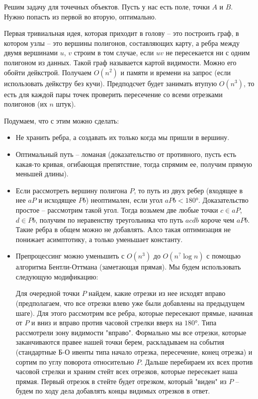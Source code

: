 \documentclass[11pt]{article}
\begin{document}
Решим задачу для точечных объектов. Пусть у нас есть поле, точки \(A\)
и \(B\). Нужно попасть из первой во вторую, оптимально.

Первая тривиальная идея, которая приходит в голову -- это построить
граф, в котором узлы -- это вершины полигонов, составляющих карту, а
ребра между двумя вершинами \(u\), \(v\) строим в том случае, если \(uv\)
не пересекается ни с одним полигоном из данных. Такой граф
называется картой видимости. Можно его обойти дейкстрой. Получаем
\(O(n^2)\) и памяти и времени на запрос (если использовать дейкстру
без кучи). Предподсчет будет занимать втупую \(O(n^3)\), то есть для
каждой пары точек проверить пересечение со всеми отрезками полигонов
(их \(n\) штук).

Подумаем, что с этим можно сделать:
\begin{itemize}
\item Не хранить ребра, а создавать их только когда мы пришли в вершину.
\item Оптимальный путь -- ломаная (доказательство от противного, пусть
есть какая-то кривая, огибающая препятствие, тогда спрямим ее,
получим прямую меньшей длины).
\item Если рассмотреть вершину полигона \(P\), то путь из двух ребер
(входящее в нее \(aP\) и исходящее \(Pb\)) неоптимален, если угол \(aPb
    < 180°\). Доказательство простое -- рассмотрим такой угол. Тогда
возьмем две любые точки \(c ∈ aP\), \(d ∈ Pb\), получим по неравенству
треугольника что путь \(acdb\) короче чем \(aPb\). Такие ребра в общем
можно не добавлять. Алсо такая оптимизация не понижает
асимптотику, а только уменьшает константу.
\item Препроцессинг можно уменьшить с \(O(n^3)\) до \(O(n^{?}\log{n})\) с
помощью алгоритма Бентли-Оттмана (заметающая прямая). Мы будем
использовать следующую модификацию:

Для очередной точки \(P\) найдем, какие отрезки из нее исходят
вправо (предполагаем, что все отрезки влево уже были добавлены на
предыдущем шаге). Для этого рассмотрим все ребра, которые
пересекают прямые, начиная от \(P\) и вниз и вправо против часовой
стрелки вверх на \(180°\). Типа рассмотрели зону видимости
"вправо". Формально мы все отрезки, которые заканчиваются правее
нашей точки берем, раскладываем на события (стандартные Б-О ивенты
типа начало отрезка, пересечение, конец отрезка) и сортим по углу
поворота относительно \(P\). Дальше перебираем их всех против
часовой стрелки и храним стейт всех отрезков, которые пересекает
наша прямая. Первый отрезок в стейте будет отрезком, который
"виден" из \(P\) -- будем по ходу дела добавлять концы видимых
отрезков в ответ.


\end{itemize}
\end{document}
